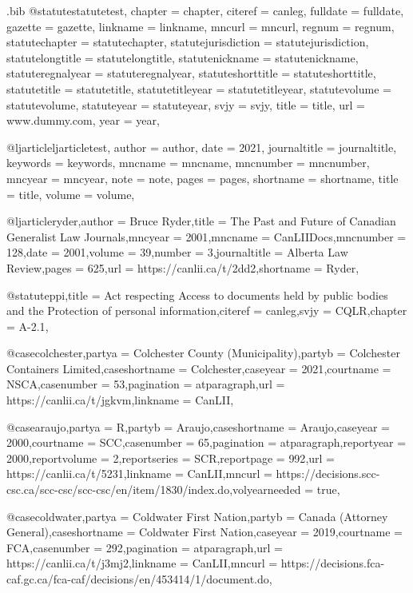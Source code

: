 \begin{filecontents*}[overwrite]{\jobname.bib}
@statute{statutetest,
chapter = {chapter},
citeref = {canleg},%
fulldate = {fulldate},
gazette = {gazette},
linkname = {linkname},
mncurl = {mncurl},
regnum = {regnum},
statutechapter = {statutechapter},
statutejurisdiction = {statutejurisdiction},
statutelongtitle = {statutelongtitle},
statutenickname = {statutenickname},
statuteregnalyear = {statuteregnalyear},
statuteshorttitle = {statuteshorttitle},
statutetitle = {statutetitle},
statutetitleyear = {statutetitleyear},
statutevolume = {statutevolume},
statuteyear = {statuteyear},
svjy = {svjy},
title = {title},
url = {www.dummy.com},
year = {year},
}

@ljarticle{ljarticletest,
author = {author},
date = {2021},
journaltitle = {journaltitle},
keywords = {keywords},
mncname = {mncname},
mncnumber = {mncnumber},
mncyear = {mncyear},
note = {note},
pages = {pages},
shortname = {shortname},
title = {title},
volume = {volume},
}

@ljarticle{ryder,author =  {Bruce Ryder},title =  {The Past and Future of Canadian Generalist Law Journals},mncyear =  {2001},mncname =  {CanLIIDocs},mncnumber =  {128},date =  {2001},volume =  {39},number =  {3},journaltitle =  {Alberta Law Review},pages =  {625},url =  {https://canlii.ca/t/2dd2},shortname =  {Ryder},}

@statute{ppi,title =  {Act respecting Access to documents held by public bodies and the Protection of personal information},citeref =  {canleg},svjy =  {CQLR},chapter =  {A-2.1},}


@case{colchester,partya =  {Colchester County (Municipality)},partyb =  {Colchester Containers Limited},caseshortname =  {Colchester},caseyear =  {2021},courtname =  {NSCA},casenumber =  {53},pagination =  {atparagraph},url =  {https://canlii.ca/t/jgkvm},linkname =  {CanLII},}



@case{araujo,partya =  {R},partyb =  {Araujo},caseshortname =  {Araujo},caseyear =  {2000},courtname =  {SCC},casenumber =  {65},pagination =  {atparagraph},reportyear =  {2000},reportvolume =  {2},reportseries =  {SCR},reportpage =  {992},url =  {https://canlii.ca/t/5231},linkname =  {CanLII},mncurl =  {https://decisions.scc-csc.ca/scc-csc/scc-csc/en/item/1830/index.do},volyearneeded =  {true}, }

@case{coldwater,partya =  {Coldwater First Nation},partyb =  {Canada (Attorney General)},caseshortname =  {Coldwater First Nation},caseyear =  {2019},courtname =  {FCA},casenumber =  {292},pagination =  {atparagraph},url =  {https://canlii.ca/t/j3mj2},linkname =  {CanLII},mncurl =  {https://decisions.fca-caf.gc.ca/fca-caf/decisions/en/453414/1/document.do},}



\end{filecontents*}
